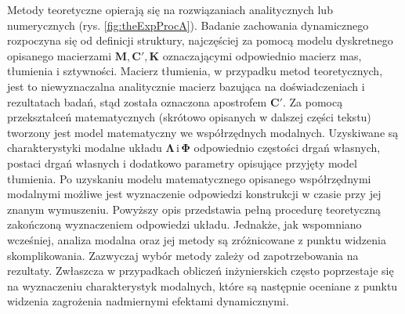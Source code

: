 Metody teoretyczne opierają się na rozwiązaniach analitycznych lub numerycznych (rys. \ref{fig:theExpProcA}). Badanie zachowania dynamicznego rozpoczyna się od definicji struktury, najczęściej za pomocą modelu dyskretnego opisanego macierzami $\mathbf{M}, \mathbf{C}', \mathbf{K}$ oznaczającymi odpowiednio macierz mas, tłumienia i sztywności. Macierz tłumienia, w przypadku metod teoretycznych, jest to niewyznaczalna analitycznie macierz bazująca na doświadczeniach i rezultatach badań, stąd została oznaczona apostrofem $\mathbf{C'}$. Za pomocą przekształceń matematycznych (skrótowo opisanych w dalszej części tekstu) tworzony jest model matematyczny we współrzędnych modalnych. Uzyskiwane są charakterystyki modalne układu $\mathbf{\Lambda} \,\mathrm{i}\, \mathbf{\Phi}$ odpowiednio częstości drgań własnych, postaci drgań własnych i dodatkowo parametry opisujące przyjęty model tłumienia. Po uzyskaniu modelu matematycznego opisanego współrzędnymi modalnymi możliwe jest wyznaczenie odpowiedzi konstrukcji w czasie przy jej znanym wymuszeniu. Powyższy opis przedstawia pełną procedurę teoretyczną zakończoną wyznaczeniem odpowiedzi układu. Jednakże, jak wspomniano wcześniej, analiza modalna oraz jej metody są zróżnicowane z punktu widzenia skomplikowania. Zazwyczaj wybór metody zależy od zapotrzebowania na rezultaty. Zwłaszcza w przypadkach obliczeń inżynierskich często poprzestaje się na wyznaczeniu charakterystyk modalnych, które są następnie oceniane z punktu widzenia zagrożenia nadmiernymi efektami dynamicznymi.
